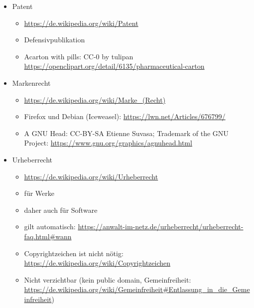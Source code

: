 \note
{
	\begin{itemize}
		\item Patent
		\begin{itemize}
			\item \url{https://de.wikipedia.org/wiki/Patent}
			\item Defensivpublikation
			\item Acarton with pills: CC-0 by tulipan \url{https://openclipart.org/detail/6135/pharmaceutical-carton}
		\end{itemize}
	\end{itemize}
}
\note
{
	\begin{itemize}
		\item Markenrecht
		\begin{itemize}
			\item \url{https://de.wikipedia.org/wiki/Marke_(Recht)}
			\item Firefox und Debian (Iceweasel): \url{https://lwn.net/Articles/676799/}
			\item A GNU Head: CC-BY-SA Etienne Suvasa; Trademark of the GNU Project: \url{https://www.gnu.org/graphics/agnuhead.html}
		\end{itemize}
	\end{itemize}
}
\note
{
	\begin{itemize}
		\item Urheberrecht
		\begin{itemize}
			\item \url{https://de.wikipedia.org/wiki/Urheberrecht}
			\item für Werke
			\item daher auch für Software
			\item gilt automatisch: \url{https://anwalt-im-netz.de/urheberrecht/urheberrecht-faq.html\#wann}
			\item Copyrightzeichen ist nicht nötig: \url{https://de.wikipedia.org/wiki/Copyrightzeichen}
			\item Nicht verzichtbar (kein public domain, Gemeinfreiheit: \url{https://de.wikipedia.org/wiki/Gemeinfreiheit\#Entlassung\_in\_die\_Gemeinfreiheit})
		\end{itemize}
	\end{itemize}
}
